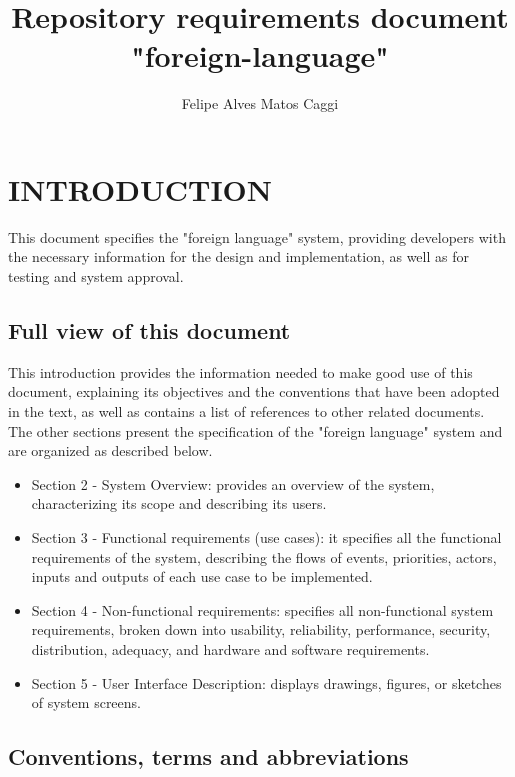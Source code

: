 \documentclass[11pt, twoside, a4paper]{book}
\begin{document}
	\title{Repository requirements document "foreign-language"}
	\author{Felipe Alves Matos Caggi}
	\maketitle
	
	\tableofcontents
	\newpage
	
	\chapter{INTRODUCTION}
		
		This document specifies the "foreign language" system, providing developers with the necessary information for the design and implementation, as well as for testing and system approval.
		
		\section{Full view of this document}
		
			This introduction provides the information needed to make good use of this document, explaining its objectives and the conventions that have been adopted in the text, as well as contains a list of references to other related documents. The other sections present the specification of the "foreign language" system and are organized as described below.
			
			\begin{itemize}
				\item Section 2 - System Overview: provides an overview of the system, characterizing its scope and describing its users.
				\item Section 3 - Functional requirements (use cases): it specifies all the functional requirements of the system, describing the flows of events, priorities, actors, inputs and outputs of each use case to be implemented.
				\item Section 4 - Non-functional requirements: specifies all non-functional system requirements, broken down into usability, reliability, performance, security, distribution, adequacy, and hardware and software requirements.
				\item Section 5 - User Interface Description: displays drawings, figures, or sketches of system screens.
			\end{itemize}						
			
		\section{Conventions, terms and abbreviations}
			
\end{document}
